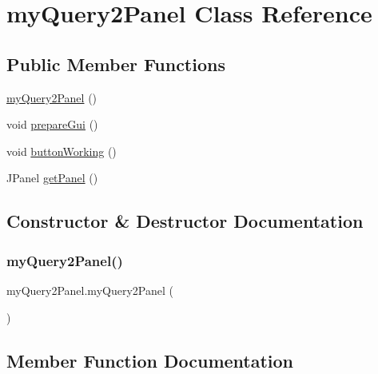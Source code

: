 \hypertarget{classmy_query2_panel}{}\section{my\+Query2\+Panel Class Reference}
\label{classmy_query2_panel}
\subsection*{Public Member Functions}
\begin{DoxyCompactItemize}
\item 
\hyperlink{classmy_query2_panel_a6bc36043976b346eb7e46eea21956042}{my\+Query2\+Panel} ()
\item 
void \hyperlink{classmy_query2_panel_a734aedb77732969bf2c9834104a0d59e}{prepare\+Gui} ()
\item 
void \hyperlink{classmy_query2_panel_a7ff73944523f85b4c3a79a4c019f73d3}{button\+Working} ()
\item 
J\+Panel \hyperlink{classmy_query2_panel_a7977bb42f9d5959684f805e08337d27b}{get\+Panel} ()
\end{DoxyCompactItemize}


\subsection{Constructor \& Destructor Documentation}
\hypertarget{classmy_query2_panel_a6bc36043976b346eb7e46eea21956042}{}\label{classmy_query2_panel_a6bc36043976b346eb7e46eea21956042} 
\subsubsection{\texorpdfstring{my\+Query2\+Panel()}{myQuery2Panel()}}
{\footnotesize\ttfamily my\+Query2\+Panel.\+my\+Query2\+Panel (\begin{DoxyParamCaption}{ }\end{DoxyParamCaption})}



\subsection{Member Function Documentation}
\hypertarget{classmy_query2_panel_a7ff73944523f85b4c3a79a4c019f73d3}{}\label{classmy_query2_panel_a7ff73944523f85b4c3a79a4c019f73d3} 

